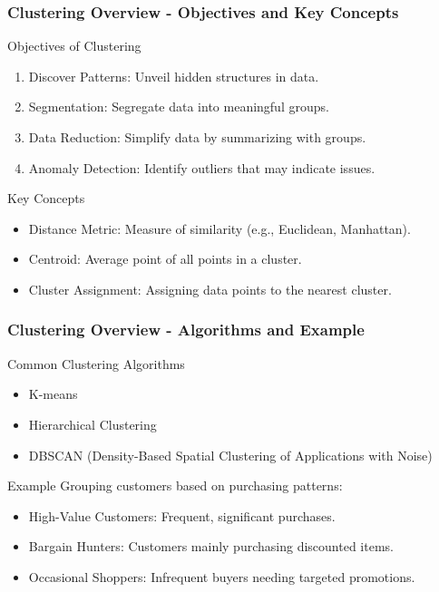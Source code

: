 \documentclass[aspectratio=169]{beamer}
\begin{document}
\begin{frame}[fragile]
    \frametitle{Clustering Overview - Objectives and Key Concepts}
    \begin{block}{Objectives of Clustering}
        \begin{enumerate}
            \item Discover Patterns: Unveil hidden structures in data.
            \item Segmentation: Segregate data into meaningful groups.
            \item Data Reduction: Simplify data by summarizing with groups.
            \item Anomaly Detection: Identify outliers that may indicate issues.
        \end{enumerate}
    \end{block}
    \begin{block}{Key Concepts}
        \begin{itemize}
            \item Distance Metric: Measure of similarity (e.g., Euclidean, Manhattan).
            \item Centroid: Average point of all points in a cluster.
            \item Cluster Assignment: Assigning data points to the nearest cluster.
        \end{itemize}
    \end{block}
\end{frame}

\begin{frame}[fragile]
    \frametitle{Clustering Overview - Algorithms and Example}
    \begin{block}{Common Clustering Algorithms}
        \begin{itemize}
            \item K-means
            \item Hierarchical Clustering
            \item DBSCAN (Density-Based Spatial Clustering of Applications with Noise)
        \end{itemize}
    \end{block}
    \begin{block}{Example}
        Grouping customers based on purchasing patterns:
        \begin{itemize}
            \item High-Value Customers: Frequent, significant purchases.
            \item Bargain Hunters: Customers mainly purchasing discounted items.
            \item Occasional Shoppers: Infrequent buyers needing targeted promotions.
        \end{itemize}
    \end{block}
\end{frame}
\end{document}
